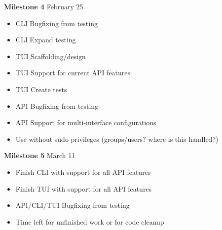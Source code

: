 \documentclass[11pt]{article}
\begin{document}
\textbf{Milestone 4} February 25
\begin{itemize}
  \item CLI Bugfixing from testing
  \item CLI Expand testing
  \item TUI Scaffolding/design
  \item TUI Support for current API features
  \item TUI Create tests
  \item API Bugfixing from testing
  \item API Support for multi-interface configurations
  \item Use without sudo privileges (groups/users? where is this handled?)
\end{itemize}

\textbf{Milestone 5} March 11
\begin{itemize}
  \item Finish CLI with support for all API features
  \item Finish TUI with support for all API features
  \item API/CLI/TUI Bugfixing from testing
  \item Time left for unfinished work or for code cleanup
\end{itemize}
\end{document}

